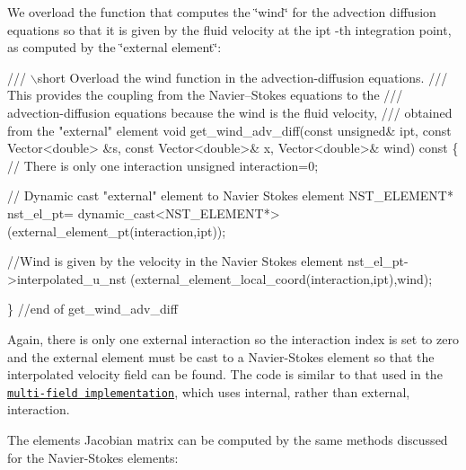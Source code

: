 We overload the function that computes the \char`\"{}wind\char`\"{} for the advection diffusion equations so that it is given by the fluid velocity at the {\ttfamily ipt} -\/th integration point, as computed by the \char`\"{}external element\char`\"{}\+:

 
\begin{DoxyCodeInclude}
 \textcolor{comment}{/// \(\backslash\)short Overload the wind function in the advection-diffusion equations.}
\textcolor{comment}{ /// This provides the coupling from the Navier--Stokes equations to the}
\textcolor{comment}{}\textcolor{comment}{ /// advection-diffusion equations because the wind is the fluid velocity,}
\textcolor{comment}{}\textcolor{comment}{ /// obtained from the "external" element}
\textcolor{comment}{} \textcolor{keywordtype}{void} get\_wind\_adv\_diff(\textcolor{keyword}{const} \textcolor{keywordtype}{unsigned}& ipt, \textcolor{keyword}{const} Vector<double> &s, 
                        \textcolor{keyword}{const} Vector<double>& x, Vector<double>& wind)\textcolor{keyword}{ const}
\textcolor{keyword}{ }\{
  \textcolor{comment}{// There is only one interaction}
  \textcolor{keywordtype}{unsigned} interaction=0;
  
  \textcolor{comment}{// Dynamic cast "external" element to Navier Stokes element}
  NST\_ELEMENT* nst\_el\_pt= \textcolor{keyword}{dynamic\_cast<}NST\_ELEMENT*\textcolor{keyword}{>}
   (external\_element\_pt(interaction,ipt));
  
  \textcolor{comment}{//Wind is given by the velocity in the Navier Stokes element}
  nst\_el\_pt->interpolated\_u\_nst
   (external\_element\_local\_coord(interaction,ipt),wind);
  
 \}  \textcolor{comment}{//end of get\_wind\_adv\_diff}

\end{DoxyCodeInclude}


Again, there is only one external interaction so the interaction index is set to zero and the external element must be cast to a Navier-\/\+Stokes element so that the interpolated velocity field can be found. The code is similar to that used in the \href{../../b_convection/html/index.html}{\tt multi-\/field implementation}, which uses internal, rather than external, interaction.

The element\textquotesingle{}s Jacobian matrix can be computed by the same methods discussed for the Navier-\/\+Stokes elements\+:


